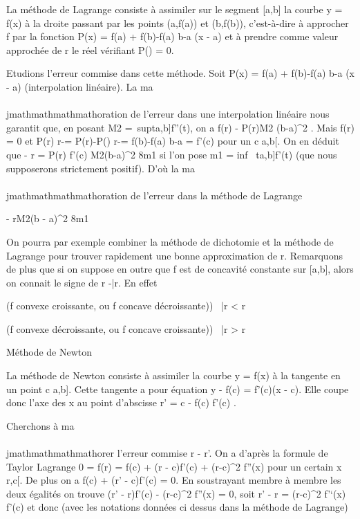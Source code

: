La méthode de Lagrange consiste à assimiler sur le segment {[}a,b{]} la
courbe y = f(x) à la droite passant par les points (a,f(a)) et (b,f(b)),
c'est-à-dire à approcher f par la fonction P(x) = f(a) + f(b)-f(a)
\over b-a (x - a) et à prendre comme valeur approchée
de r le réel \barr vérifiant
P(\barr) = 0.

Etudions l'erreur commise dans cette méthode. Soit P(x) = f(a) +
f(b)-f(a) \over b-a (x - a) (interpolation linéaire).
La ma\\\\jmathmathmathmathoration de l'erreur dans une interpolation linéaire nous garantit
que, en posant M2 =\
supt\in{[}a,b{]}\textbar{}f''(t)\textbar{}, on a \textbar{}f(r)
- P(r)\textbar{}\leq M2 (b-a)^2  . Mais f(r) = 0 et  P(r) \over
r-\barr = P(r)-P(\barr)
\over r-\barr = f(b)-f(a)
\over b-a = f'(c) pour un c \in{]}a,b{[}. On en déduit
que \textbar{}\barr - r\textbar{} =
\left \textbar{} P(r) \over f'(c)
\right \textbar{}\leq M2(b-a)^2
\over 8m1 si l'on pose m1
= inf~
t\in{[}a,b{]}\textbar{}f'(t)\textbar{} (que nous supposerons
strictement positif). D'où la ma\\\\jmathmathmathmathoration de l'erreur dans la méthode de
Lagrange

\textbar{}\barr - r\textbar{}\leq M2(b -
a)^2 \over 8m1

On pourra par exemple combiner la méthode de dichotomie et la méthode de
Lagrange pour trouver rapidement une bonne approximation de r.
Remarquons de plus que si on suppose en outre que f est de concavité
constante sur {[}a,b{]}, alors on connait le signe de r
-\bar r. En effet

(f convexe croissante, ou f concave décroissante))
\rigtharrow~\bar r \textless{} r

(f convexe décroissante, ou f concave croissante))
\rigtharrow~\bar r \textgreater{} r

Méthode de Newton

La méthode de Newton consiste à assimiler la courbe y = f(x) à la
tangente en un point c \in {[}a,b{]}. Cette tangente a pour équation y -
f(c) = f'(c)(x - c). Elle coupe donc l'axe des x au point d'abscisse r'
= c - f(c) \over f'(c) .

Cherchons à ma\\\\jmathmathmathmathorer l'erreur commise \textbar{}r - r'\textbar{}. On a
d'après la formule de Taylor Lagrange 0 = f(r) = f(c) + (r - c)f'(c) +
(r-c)^2 \over 2 f''(x) pour un certain x
\in{]}r,c{[}. De plus on a f(c) + (r' - c)f'(c) = 0. En soustrayant membre
à membre les deux égalités on trouve (r' - r)f'(c) -
(r-c)^2  f''(x) = 0, soit r' - r =
(r-c)^2 \over 2  f'`(x)
\over f'(c) et donc (avec les notations données ci
dessus dans la méthode de Lagrange)

